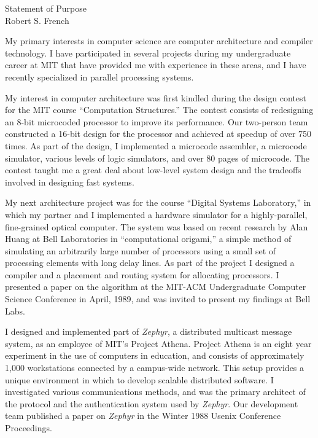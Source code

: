 \setlength{\oddsidemargin}{0in}
\setlength{\evensidemargin}{0in}
\setlength{\textwidth}{6.5in}
\setlength{\topmargin}{-.3in}
\setlength{\textheight}{9in}
\pagestyle{empty}



\begin{center}
{\Large Statement of Purpose} \\[.3in]
{\large Robert S. French}
\end{center}

\vspace*{.5in}

My primary interests in computer science are computer architecture and
compiler technology.  I have participated in several projects during
my undergraduate career at MIT that have provided me with experience
in these areas, and I have recently specialized in parallel processing
systems.

My interest in computer architecture was first kindled during the
design contest for the MIT course ``Computation Structures.''  The
contest consists of redesigning an 8-bit microcoded processor to
improve its performance.  Our two-person team constructed a 16-bit
design for the processor and achieved at speedup of over 750 times.
As part of the design, I implemented a microcode assembler, a
microcode simulator, various levels of logic simulators, and over 80
pages of microcode.  The contest taught me a great deal about
low-level system design and the tradeoffs involved in designing fast
systems.

My next architecture project was for the course ``Digital Systems
Laboratory,'' in which my partner and I implemented a hardware
simulator for a highly-parallel, fine-grained optical computer.  The
system was based on recent research by Alan Huang at Bell Laboratories
in ``computational origami,'' a simple method of simulating an
arbitrarily large number of processors using a small set of processing
elements with long delay lines.  As part of the project I designed a
compiler and a placement and routing system for allocating processors.
I presented a paper on the algorithm at the MIT-ACM Undergraduate
Computer Science Conference in April, 1989, and was invited to present
my findings at Bell Labs.

I designed and implemented part of {\em Zephyr\/}, a distributed
multicast message system, as an employee of MIT's Project Athena.
Project Athena is an eight year experiment in the use of computers in
education, and consists of approximately 1,000 workstations connected
by a campus-wide network.  This setup provides a unique environment in
which to develop scalable distributed software.  I investigated
various communications methods, and was the primary architect of the
protocol and the authentication system used by {\em Zephyr\/}.  Our
development team published a paper on {\em Zephyr\/} in the Winter
1988 Usenix Conference Proceedings.

